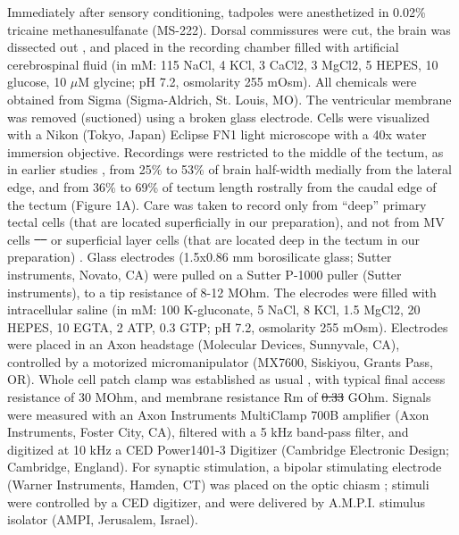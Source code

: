 \documentclass{article}
\providecommand{\DIFaddtex}[1]{{\protect\color{blue}{#1}}} %
\providecommand{\DIFdeltex}[1]{{\protect\color{red}\sout{#1}}}                      %
\providecommand{\DIFaddbegin}{} %
\providecommand{\DIFaddend}{} %
\providecommand{\DIFdelbegin}{} %
\providecommand{\DIFdelend}{} %
\providecommand{\DIFadd}[1]{\texorpdfstring{\DIFaddtex{#1}}{#1}} %
\providecommand{\DIFdel}[1]{\texorpdfstring{\DIFdeltex{#1}}{}} %
\newcommand{\DIFscaledelfig}{0.5}
\newlength{\DIFdelgraphicswidth} %
\newlength{\DIFdelgraphicsheight} %
\newcommand{\DIFaddincludegraphics}[2][]{{\color{blue}\fbox{\DIFOincludegraphics[#1]{#2}}}} %
\newcommand{\DIFdelincludegraphics}[2][]{%
\sbox{\DIFdelgraphicsbox}{\DIFOincludegraphics[#1]{#2}}%
\settoboxwidth{\DIFdelgraphicswidth}{\DIFdelgraphicsbox} %
\settoboxtotalheight{\DIFdelgraphicsheight}{\DIFdelgraphicsbox} %
\scalebox{\DIFscaledelfig}{%
\parbox[b]{\DIFdelgraphicswidth}{\usebox{\DIFdelgraphicsbox}\\[-\baselineskip] \rule{\DIFdelgraphicswidth}{0em}}\llap{\resizebox{\DIFdelgraphicswidth}{\DIFdelgraphicsheight}{%
\setlength{\unitlength}{\DIFdelgraphicswidth}%
\begin{picture}(1,1)%
\thicklines\linethickness{2pt} %
{\color[rgb]{1,0,0}\put(0,0){\framebox(1,1){}}}%
{\color[rgb]{1,0,0}\put(0,0){\line( 1,1){1}}}%
{\color[rgb]{1,0,0}\put(0,1){\line(1,-1){1}}}%
\end{picture}%
}\hspace*{3pt}}} %
} %
\DeclareRobustCommand{\DIFaddbegin}{\DIFOaddbegin \let\includegraphics\DIFaddincludegraphics} %
\DeclareRobustCommand{\DIFaddend}{\DIFOaddend \let\includegraphics\DIFOincludegraphics} %
\DeclareRobustCommand{\DIFdelbegin}{\DIFOdelbegin \let\includegraphics\DIFdelincludegraphics} %
\DeclareRobustCommand{\DIFdelend}{\DIFOaddend \let\includegraphics\DIFOincludegraphics} %
\begin{document}
Immediately after sensory conditioning, tadpoles were anesthetized in 0.02\% tricaine methanesulfanate (MS-222). Dorsal commissures were cut, the brain was dissected out \citep{aizenman2003,ciarleglio2015}, and placed in the recording chamber filled with artificial cerebrospinal fluid (in mM: 115 NaCl, 4 KCl, 3 CaCl2, 3 MgCl2, 5 HEPES, 10 glucose, 10 $\mu$M glycine; pH 7.2, osmolarity 255 mOsm). All chemicals were obtained from Sigma (Sigma-Aldrich, St. Louis, MO). The ventricular membrane was removed (suctioned) using a broken glass electrode. Cells were visualized with a Nikon (Tokyo, Japan) Eclipse FN1 light microscope with a 40x water immersion objective. Recordings were restricted to the middle of the tectum, as in earlier studies \citep{ciarleglio2015}, from 25\% to 53\% of brain half-width medially from the lateral edge, and from 36\% to 69\% of tectum length rostrally from the caudal edge of the tectum (Figure 1A). Care was taken to record only from “deep” primary tectal cells (that are located superficially in our preparation), and not from MV cells \DIFdelbegin \DIFdel{\mbox{%
\citep{pratt2009} }\hspace{0pt}%
}\DIFdelend \DIFaddbegin \DIFadd{\mbox{%
\citep{pratt2009trigeminal} }\hspace{0pt}%
}\DIFaddend or superficial layer cells (that are located deep in the tectum in our preparation) \citep{liu2016}. Glass electrodes (1.5x0.86 mm borosilicate glass; Sutter instruments, Novato, CA) were pulled on a Sutter P-1000 puller (Sutter instruments), to a tip resistance of 8-12 MOhm. The elecrodes were filled with intracellular saline (in mM: 100 K-gluconate, 5 NaCl, 8 KCl, 1.5 MgCl2, 20 HEPES, 10 EGTA, 2 ATP, 0.3 GTP; pH 7.2, osmolarity 255 mOsm). Electrodes were placed in an Axon headstage (Molecular Devices, Sunnyvale, CA), controlled by a motorized micromanipulator (MX7600, Siskiyou, Grants Pass, OR). Whole cell patch clamp was established as usual \citep{ciarleglio2015}, with typical final access resistance of 30 MOhm, and membrane resistance Rm of \DIFdelbegin \DIFdel{0.33 }\DIFdelend \DIFaddbegin \DIFadd{3.2 }\DIFaddend GOhm. Signals were measured with an Axon Instruments MultiClamp 700B amplifier (Axon Instruments, Foster City, CA), filtered with a 5 kHz band-pass filter, and digitized at 10 kHz a CED Power1401-3 Digitizer (Cambridge Electronic Design; Cambridge, England). For synaptic stimulation, a bipolar stimulating electrode (Warner Instruments, Hamden, CT) was placed on the optic chiasm \citep{wu1996}; stimuli were controlled by a CED digitizer, and were delivered by A.M.P.I. stimulus isolator (AMPI, Jerusalem, Israel).
\end{document}
